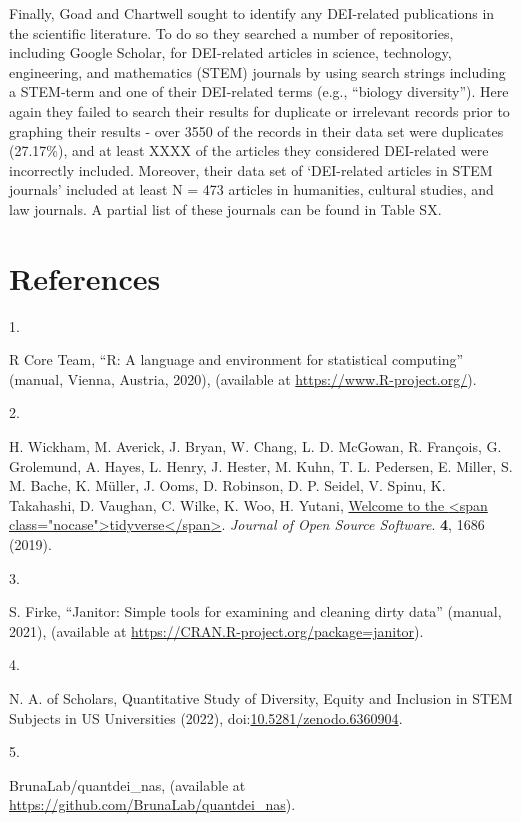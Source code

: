 \documentclass[
  12pt,
  man, donotrepeattitle]{apa6}
\newlength{\cslhangindent}
\newlength{\csllabelwidth}
\newlength{\cslentryspacingunit} %
\newenvironment{CSLReferences}[2] %
 {%
  \setlength{\parindent}{0pt}
  \ifodd #1
  \let\oldpar\par
  \def\par{\hangindent=\cslhangindent\oldpar}
  \fi
  \setlength{\parskip}{#2\cslentryspacingunit}
 }%
 {}
\newcommand{\CSLLeftMargin}[1]{\parbox[t]{\csllabelwidth}{#1}}
\newcommand{\CSLRightInline}[1]{\parbox[t]{\linewidth - \csllabelwidth}{#1}\break}
\begin{document}
Finally, Goad and Chartwell sought to identify any DEI-related publications in the scientific literature. To do so they searched a number of repositories, including Google Scholar, for DEI-related articles in science, technology, engineering, and mathematics (STEM) journals by using search strings including a STEM-term and one of their DEI-related terms (e.g., ``biology diversity''). Here again they failed to search their results for duplicate or irrelevant records prior to graphing their results - over 3550 of the records in their data set were duplicates (27.17\%), and at least XXXX of the articles they considered DEI-related were incorrectly included. Moreover, their data set of `DEI-related articles in STEM journals' included at least N = 473 articles in humanities, cultural studies, and law journals. A partial list of these journals can be found in Table SX.

\newpage

\hypertarget{references}{%
\section{References}\label{references}}

\hypertarget{refs}{}
\begin{CSLReferences}{0}{0}
\leavevmode{}%
\CSLLeftMargin{1. }%
\CSLRightInline{R Core Team, {``R: {A} language and environment for statistical computing''} (manual, Vienna, Austria, 2020), (available at \url{https://www.R-project.org/}).}

\leavevmode{}%
\CSLLeftMargin{2. }%
\CSLRightInline{H. Wickham, M. Averick, J. Bryan, W. Chang, L. D. McGowan, R. François, G. Grolemund, A. Hayes, L. Henry, J. Hester, M. Kuhn, T. L. Pedersen, E. Miller, S. M. Bache, K. Müller, J. Ooms, D. Robinson, D. P. Seidel, V. Spinu, K. Takahashi, D. Vaughan, C. Wilke, K. Woo, H. Yutani, \href{https://doi.org/10.21105/joss.01686}{Welcome to the {\textless{}}span class="nocase"{\textgreater{}}tidyverse{\textless{}}/span{\textgreater{}}}. \emph{Journal of Open Source Software}. \textbf{4}, 1686 (2019).}

\leavevmode{}%
\CSLLeftMargin{3. }%
\CSLRightInline{S. Firke, {``Janitor: {Simple} tools for examining and cleaning dirty data''} (manual, 2021), (available at \url{https://CRAN.R-project.org/package=janitor}).}

\leavevmode{}%
\CSLLeftMargin{4. }%
\CSLRightInline{N. A. of Scholars, Quantitative {Study} of {Diversity}, {Equity} and {Inclusion} in {STEM} {Subjects} in {US} {Universities} (2022), doi:\href{https://doi.org/10.5281/zenodo.6360904}{10.5281/zenodo.6360904}.}

\leavevmode{}%
\CSLLeftMargin{5. }%
\CSLRightInline{{BrunaLab}/quantdei\_nas, (available at \url{https://github.com/BrunaLab/quantdei_nas}).}

\end{CSLReferences}
\end{document}
